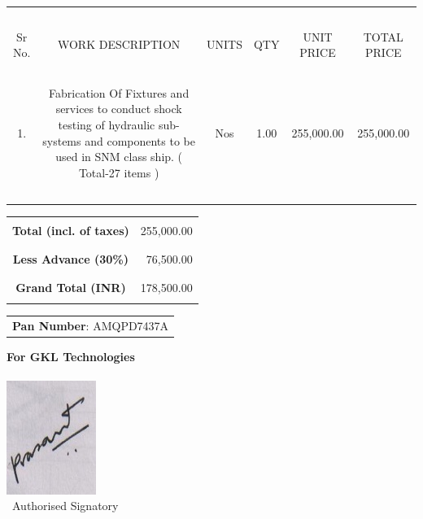 \documentclass[11pt,a4]{article}
\begin{document}
{{\begin{center}
\begin{tabular}{|c|c|c|c|c|c|}
 \ & & &  & &  \\

 Sr No. & WORK DESCRIPTION & UNITS & QTY & UNIT PRICE & TOTAL PRICE\\
 \hline\ & & &  & &  \\
 
  1.  &   \parbox{2.95in}{\footnotesize Fabrication Of Fixtures and services to conduct shock
testing of hydraulic sub-systems and components to be used in SNM class ship.
( Total-27 items ) }

 &   Nos & 1.00 & 255,000.00 & 255,000.00 \\

                                    
\ & & &  & &  \\
\hline

                                    
\end{tabular}
\end{center}
}


\hspace*{10.95cm}
\begin{tabular}{|c|r|}
\hline
& \\
{\bf Total (incl. of taxes)} & 255,000.00 \\
& \\
\hline
& \\
{\bf Less Advance (30\%)} & 76,500.00\\
& \\
\hline
& \\
{\bf Grand Total (INR)} & 178,500.00\\
& \\ 
\hline
\end{tabular}

\vspace*{-2.2cm}
\noindent \hspace*{6mm} \begin{tabular}{c}
\parbox{3in}{ { \bf Pan Number}:   AMQPD7437A }\\
\end{tabular}
\vspace*{85pt}


{\bf For GKL Technologies } \\ \\ 
\hspace*{2cm}\includegraphics{signjpg.jpg}\\ \
 \hspace*{0.6cm}Authorised Signatory
\vspace*{-72pt}

}
\end{document}

